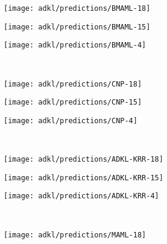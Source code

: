 \begin{figure}[ht]
    \centering
    \begin{subfigure}{.3\textwidth}
        \centering
        \texttt{[image: adkl/predictions/BMAML-18]}
    \end{subfigure}
    \hfill
    \begin{subfigure}{.3\textwidth}
        \centering
        \texttt{[image: adkl/predictions/BMAML-15]}
    \end{subfigure}
    \hfill
    \begin{subfigure}{.3\textwidth}
        \centering
        \texttt{[image: adkl/predictions/BMAML-4]}
    \end{subfigure}
    \\
    \begin{subfigure}{.3\textwidth}
        \centering
        \texttt{[image: adkl/predictions/CNP-18]}
    \end{subfigure}
    \hfill
    \begin{subfigure}{.3\textwidth}
        \centering
        \texttt{[image: adkl/predictions/CNP-15]}
    \end{subfigure}
    \hfill
    \begin{subfigure}{.3\textwidth}
        \centering
        \texttt{[image: adkl/predictions/CNP-4]}
    \end{subfigure}
    \\
    \begin{subfigure}{.3\textwidth}
        \centering
        \texttt{[image: adkl/predictions/ADKL-KRR-18]}
    \end{subfigure}
    \hfill
    \begin{subfigure}{.3\textwidth}
        \centering
        \texttt{[image: adkl/predictions/ADKL-KRR-15]}
    \end{subfigure}
    \hfill
    \begin{subfigure}{.3\textwidth}
        \centering
        \texttt{[image: adkl/predictions/ADKL-KRR-4]}
    \end{subfigure}
    \\
    \begin{subfigure}{.3\textwidth}
        \centering
        \texttt{[image: adkl/predictions/MAML-18]}
    \end{subfigure}
    \hfill
    \begin{subfigure}{.3\textwidth}

\end{subfigure}
\end{figure}
